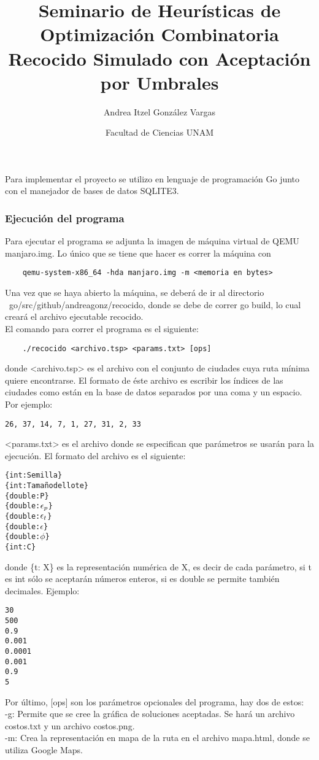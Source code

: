 \documentclass[12pt]{article}
\title{Seminario de Heurísticas de Optimización Combinatoria \\ Recocido Simulado con Aceptación por Umbrales}
\author{Andrea Itzel González Vargas}
\date{Facultad de Ciencias UNAM}
\begin{document}
\maketitle
Para implementar el proyecto se utilizo en lenguaje de programación Go junto con el manejador de bases de datos SQLITE3.
\subsubsection{Ejecución del programa}
Para ejecutar el programa se adjunta la imagen de máquina virtual de QEMU \textsf{manjaro.img}. Lo único que se tiene que hacer es correr la máquina con
\begin{verbatim}
    qemu-system-x86_64 -hda manjaro.img -m <memoria en bytes>
\end{verbatim}
Una vez que se haya abierto la máquina, se deberá de ir al directorio \textsf{~go/src/github/andreagonz/recocido}, donde se debe de correr \textsf{go build}, lo cual creará el archivo ejecutable \textsf{recocido}. \\
El comando para correr el programa es el siguiente:
\begin{verbatim}
    ./recocido <archivo.tsp> <params.txt> [ops]
\end{verbatim}
donde \textsf{<archivo.tsp>} es el archivo con el conjunto de ciudades cuya ruta mínima quiere encontrarse. El formato de éste archivo es escribir los índices de las ciudades como están en la base de datos separados por una coma y un espacio. Por ejemplo:
\begin{verbatim}
26, 37, 14, 7, 1, 27, 31, 2, 33
\end{verbatim}
\textsf{<params.txt>} es el archivo donde se especifican que parámetros se usarán para la ejecución. El formato del archivo es el siguiente:
\begin{alltt}
\{int: Semilla\}
\{int: Tamaño del lote\}
\{double: P\}
\{double: \(\epsilon\sb{p}\)\}
\{double: \(\epsilon\sb{t}\)\}
\{double: \(\epsilon\)\}
\{double: \(\phi\)\}
\{int: C\}
\end{alltt}
donde \textsf{\{t: X\}} es la representación numérica de \textsf{X}, es decir de cada parámetro, si \textsf{t} es \textsf{int} sólo se aceptarán números enteros, si es \textsf{double} se permite también decimales. Ejemplo:
\begin{verbatim}
30
500
0.9
0.001
0.0001
0.001
0.9
5
\end{verbatim}
Por último, \textsf{[ops]} son los parámetros opcionales del programa, hay dos de estos: \\
\textsf{-g}: Permite que se cree la gráfica de soluciones aceptadas. Se hará un archivo \textsf{costos.txt} y un archivo \textsf{costos.png}. \\

\textsf{-m}: Crea la representación en mapa de la ruta en el archivo \textsf{mapa.html}, donde se utiliza Google Maps. \\
\end{document}
